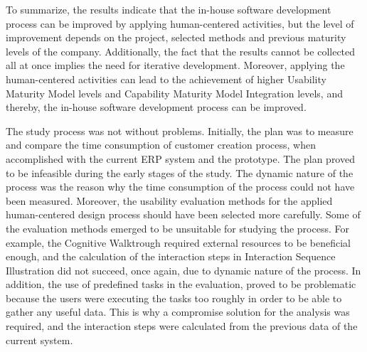 \documentclass[12pt,a4paper,oneside,pdftex]{report}
\begin{document}
To summarize, the results indicate that the in-house software development process can be improved by applying human-centered activities, but the level of improvement depends on the project, selected methods and previous maturity levels of the company. Additionally, the fact that the results cannot be collected all at once implies the need for iterative development. Moreover, applying the human-centered activities can lead to the achievement of higher Usability Maturity Model levels and Capability Maturity Model Integration levels, and thereby, the in-house software development process can be improved.   

The study process was not without problems. Initially, the plan was to measure and compare the time consumption of customer creation process, when accomplished with the current ERP system and the prototype. The plan proved to be infeasible during the early stages of the study. The dynamic nature of the process was the reason why the time consumption of the process could not have been measured. Moreover, the usability evaluation methods for the applied human-centered design process should have been selected more carefully. 
Some of the evaluation methods emerged to be unsuitable for studying the process. For example, the Cognitive Walktrough required external resources to be beneficial enough, and the calculation of the interaction steps in Interaction Sequence Illustration did not succeed, once again, due to dynamic  nature of the process. In addition, the use of predefined tasks in the evaluation, proved to be problematic because the users were executing the tasks too roughly in order to be able to gather any useful data. This is why a compromise solution for the analysis was required, and the interaction steps were calculated from the previous data of the current system. 
\end{document}
